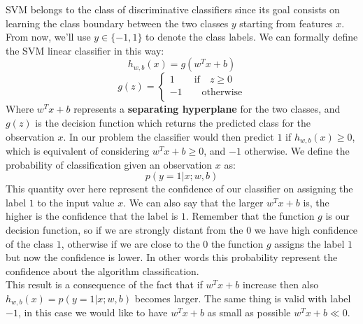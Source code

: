 SVM belongs to the class of discriminative classifiers since its goal consists on learning the class boundary between the two classes $y$ starting from features $x$. From now, we'll use $y\in\{-1,1\}$ to denote the class labels.
We can formally define the SVM linear classifier in this way:
$$h_{w,b}(x) = g(w^Tx + b)$$
$$
g(z)=
\begin{cases}
1\qquad \text{if} \quad z \geq 0\\
-1\qquad \text{otherwise}\\
\end{cases}
$$
Where $w^Tx + b$ represents a \textbf{separating hyperplane} for the two classes, and $g(z)$ is the decision function which returns the predicted class for the observation $x$.
In our problem the classifier would then predict $1$ if $h_{w,b}(x) \geq 0$, which is equivalent of considering $w^Tx + b \geq 0$, and $-1$ otherwise.
We define the probability of classification given an observation $x$ as:
$$p(y = 1 | x; w,b)$$
This quantity over here represent the confidence of our classifier on assigning the label $1$ to the input value $x$. We can also say that the larger $w^Tx + b$ is, the higher is the confidence that the label is $1$. Remember that the function $g$ is our decision function, so if we are strongly distant from the $0$ we have high confidence of the class $1$, otherwise if we are close to the $0$ the function $g$ assigns the label $1$ but now the confidence is lower. In other words this probability represent the confidence about the algorithm classification.\\
This result is a consequence of the fact that if $w^Tx + b$ increase then also $h_{w,b}(x)= p(y = 1 | x; w,b)$ becomes larger. The same thing is valid with label $-1$, in this case we would like to have $w^Tx + b$ as small as possible $w^Tx + b \ll 0$.\\

